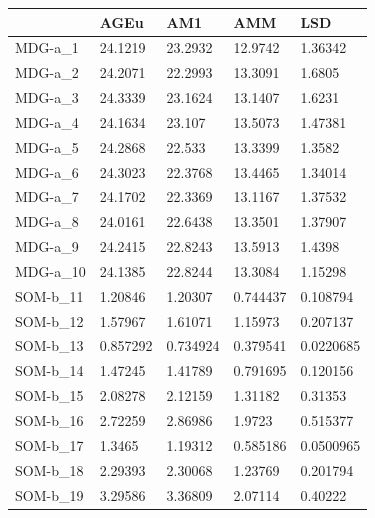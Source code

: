 \documentclass[11pt,a4paper]{article}
\begin{document}
	\begin{table}[H]
		\centering
		\begin{tabular}{l|l|l|l|l|}
			\cline{2-5}
			& AGEu     & AM1      & AMM      & LSD       \\ \hline
			\multicolumn{1}{|l|}{MDG-a\_1}  & 24.1219  & 23.2932  & 12.9742  & 1.36342   \\ \hline
			\multicolumn{1}{|l|}{MDG-a\_2}  & 24.2071  & 22.2993  & 13.3091  & 1.6805    \\ \hline
			\multicolumn{1}{|l|}{MDG-a\_3}  & 24.3339  & 23.1624  & 13.1407  & 1.6231    \\ \hline
			\multicolumn{1}{|l|}{MDG-a\_4}  & 24.1634  & 23.107   & 13.5073  & 1.47381   \\ \hline
			\multicolumn{1}{|l|}{MDG-a\_5}  & 24.2868  & 22.533   & 13.3399  & 1.3582    \\ \hline
			\multicolumn{1}{|l|}{MDG-a\_6}  & 24.3023  & 22.3768  & 13.4465  & 1.34014   \\ \hline
			\multicolumn{1}{|l|}{MDG-a\_7}  & 24.1702  & 22.3369  & 13.1167  & 1.37532   \\ \hline
			\multicolumn{1}{|l|}{MDG-a\_8}  & 24.0161  & 22.6438  & 13.3501  & 1.37907   \\ \hline
			\multicolumn{1}{|l|}{MDG-a\_9}  & 24.2415  & 22.8243  & 13.5913  & 1.4398    \\ \hline
			\multicolumn{1}{|l|}{MDG-a\_10} & 24.1385  & 22.8244  & 13.3084  & 1.15298   \\ \hline
			\multicolumn{1}{|l|}{SOM-b\_11} & 1.20846  & 1.20307  & 0.744437 & 0.108794  \\ \hline
			\multicolumn{1}{|l|}{SOM-b\_12} & 1.57967  & 1.61071  & 1.15973  & 0.207137  \\ \hline
			\multicolumn{1}{|l|}{SOM-b\_13} & 0.857292 & 0.734924 & 0.379541 & 0.0220685 \\ \hline
			\multicolumn{1}{|l|}{SOM-b\_14} & 1.47245  & 1.41789  & 0.791695 & 0.120156  \\ \hline
			\multicolumn{1}{|l|}{SOM-b\_15} & 2.08278  & 2.12159  & 1.31182  & 0.31353   \\ \hline
			\multicolumn{1}{|l|}{SOM-b\_16} & 2.72259  & 2.86986  & 1.9723   & 0.515377  \\ \hline
			\multicolumn{1}{|l|}{SOM-b\_17} & 1.3465   & 1.19312  & 0.585186 & 0.0500965 \\ \hline
			\multicolumn{1}{|l|}{SOM-b\_18} & 2.29393  & 2.30068  & 1.23769  & 0.201794  \\ \hline
			\multicolumn{1}{|l|}{SOM-b\_19} & 3.29586  & 3.36809  & 2.07114  & 0.40222   \\ \hline

\end{tabular}
\end{table}
\end{document}
